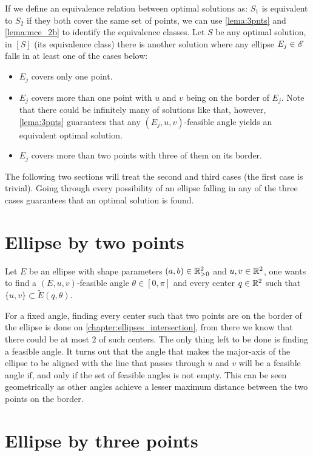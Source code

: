 If we define an equivalence relation between optimal solutions as: $S_1$ is equivalent to $S_2$ if they both cover the same set of points, we can use \autoref{lema:3pnts} and \autoref{lema:mce_2b} to identify the equivalence classes. Let $S$ be any optimal solution, in $[S]$ (its equivalence class) there is another solution where any ellipse $E_j \in \mathscr{E}$ falls in at least one of the cases below:
\begin{itemize}
	\item $E_j$ covers only one point.
	\item $E_j$ covers more than one point with $u$ and $v$ being on the border of $E_j$. Note that there could be infinitely many of solutions like that, however, \autoref{lema:3pnts} guarantees that any $(E_j, u, v)$-feasible angle yields an equivalent optimal solution.
	\item $E_j$ covers more than two points with three of them on its border.
\end{itemize}

The following two sections will treat the second and third cases (the first case is trivial). Going through every possibility of an ellipse falling in any of the three cases guarantees that an optimal solution is found.

\section{Ellipse by two points}

Let $E$ be an ellipse with shape parameters $(a, b)\in \mathbb{R}^2_{>0}$ and $u, v\in \mathbb{R}^2$, one wants to find a $(E, u, v)$-feasible angle $\theta\in[0,\pi]$ and every center $q\in\mathbb{R}^2$ such that $\{u, v\} \subset \tilde{E}(q, \theta)$.

For a fixed angle, finding every center such that two points are on the border of the ellipse is done on \autoref{chapter:ellipses_intersection}, from there we know that there could be at most $2$ of such centers. The only thing left to be done is finding a feasible angle. It turns out that the angle that makes the major-axis of the ellipse to be aligned with the line that passes through $u$ and $v$ will be a feasible angle if, and only if the set of feasible angles is not empty. This can be seen geometrically as other angles achieve a lesser maximum distance between the two points on the border.

\section{Ellipse by three points}


